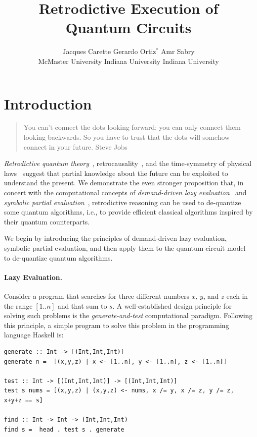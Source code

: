 \documentclass{article}
\title{Retrodictive Execution of Quantum Circuits}
\author{Jacques Carette \qquad Gerardo Ortiz$^{*}$ \qquad Amr Sabry \\
McMaster University \qquad Indiana University \qquad Indiana University}
\begin{document}
\maketitle

\begin{abstract}
\end{abstract}


\section{Introduction}

\begin{quote}
You can’t connect the dots looking forward; you can only connect them
looking backwards.  So you have to trust that the dots will somehow
connect in your future. Steve Jobs
\end{quote}

\emph{Retrodictive quantum theory}~\cite{sym13040586},
retrocausality~\cite{Aharonov2008}, and the time-symmetry of physical
laws~\cite{RevModPhys.27.179} suggest that partial knowledge about the
future can be exploited to understand the present. We demonstrate the
even stronger proposition that, in concert with the computational
concepts of \emph{demand-driven lazy evaluation}~\cite{lazyevaluator}
and \emph{symbolic partial evaluation}~\cite{futamura}, retrodictive
reasoning can be used to de-quantize some quantum algorithms, i.e., to
provide efficient classical algorithms inspired by their quantum
counterparts.

We begin by introducing the principles of demand-driven lazy
evaluation, symbolic partial evaluation, and then apply them to the
quantum circuit model to de-quantize quantum algorithms.

\paragraph*{Lazy Evaluation.}
Consider a program that searches for three different numbers $x$, $y$,
and $z$ each in the range $[1..n]$ and that sum to $s$. A
well-established design principle for solving such problems is the
\emph{generate-and-test} computational paradigm. Following this
principle, a simple program to solve this problem in the programming
language Haskell is:

\begin{verbatim}
generate :: Int -> [(Int,Int,Int)]
generate n =  [(x,y,z) | x <- [1..n], y <- [1..n], z <- [1..n]]

test :: Int -> [(Int,Int,Int)] -> [(Int,Int,Int)]
test s nums = [(x,y,z) | (x,y,z) <- nums, x /= y, x /= z, y /= z, x+y+z == s]

find :: Int -> Int -> (Int,Int,Int)
find s =  head . test s . generate
\end{verbatim}
\end{document}
